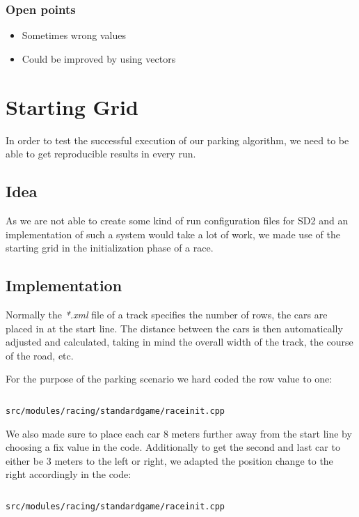 \documentclass[paper=a4, fontsize=11pt]{scrreprt}
\begin{document}
\subsubsection{Open points}
\begin{itemize}
  \item Sometimes wrong values
  \item Could be improved by using vectors
\end{itemize}

\section{Starting Grid}
In order to test the successful execution of our parking algorithm,
we need to be able to get reproducible results in every run.

\subsection{Idea}
As we are not able to create some kind of run configuration files for SD2
and an implementation of such a system would take a lot of work,
we made use of the starting grid in the initialization phase of a race.

\subsection{Implementation}
Normally the \textit{*.xml} file of a track specifies the number of rows,
the cars are placed in at the start line.
The distance between the cars is then automatically adjusted and calculated,
taking in mind the overall width of the track, the course of the road, etc.

For the purpose of the parking scenario we hard coded the row value to one:
\begin{listing}[ht]
  \inputminted[firstline=309,linenos=true,lastline=311]{c++}{../../../simulators/speed-dreams/src/modules/racing/standardgame/raceinit.cpp}
  \caption{\texttt{src/modules/racing/standardgame/raceinit.cpp}}
\end{listing}

We also made sure to place each car 8 meters further away from the start line by choosing a fix value in the code.
Additionally to get the second and last car to either be 3 meters to the left or right,
we adapted the position change to the right accordingly in the code:
\begin{listing}[ht]
  \inputminted[firstline=316,linenos=true,lastline=327]{c++}{../../../simulators/speed-dreams/src/modules/racing/standardgame/raceinit.cpp}
  \caption{\texttt{src/modules/racing/standardgame/raceinit.cpp}}
\end{listing}
\end{document}
